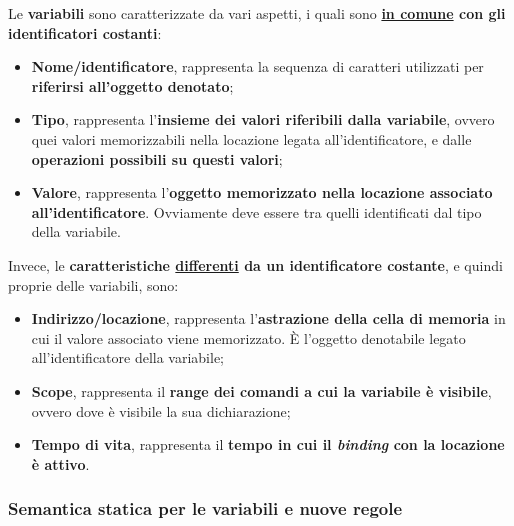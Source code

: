 \documentclass[a4paper]{article}
\begin{document}
	Le \textcolor{Red3}{\textbf{variabili}} sono caratterizzate da vari aspetti, i quali sono \textbf{\underline{in comune} con gli identificatori costanti}:
	\begin{itemize}
		\item \textbf{Nome/identificatore}, rappresenta la sequenza di caratteri utilizzati per \textbf{riferirsi all'oggetto denotato};
		
		\item \textbf{Tipo}, rappresenta l'\textbf{insieme dei valori riferibili dalla variabile}, ovvero quei valori memorizzabili nella locazione legata all'identificatore, e dalle \textbf{operazioni possibili su questi valori};
		
		\item \textbf{Valore}, rappresenta l'\textbf{oggetto memorizzato nella locazione associato all'identificatore}. Ovviamente deve essere tra quelli identificati dal tipo della variabile.
	\end{itemize}
	Invece, le \textbf{caratteristiche \underline{differenti} da un identificatore costante}, e quindi proprie delle variabili, sono:
	\begin{itemize}
		\item \textbf{Indirizzo/locazione}, rappresenta l'\textbf{astrazione della cella di memoria} in cui il valore associato viene memorizzato. È l'oggetto denotabile legato all'identificatore della variabile;
		
		\item \textbf{Scope}, rappresenta il \textbf{range dei comandi a cui la variabile è visibile}, ovvero dove è visibile la sua dichiarazione;
		
		\item \textbf{Tempo di vita}, rappresenta il \textbf{tempo in cui il \emph{binding} con la locazione è attivo}.
	\end{itemize}\newpage
	
	\subsubsection{Semantica statica per le variabili e nuove regole}
	
\end{document}
